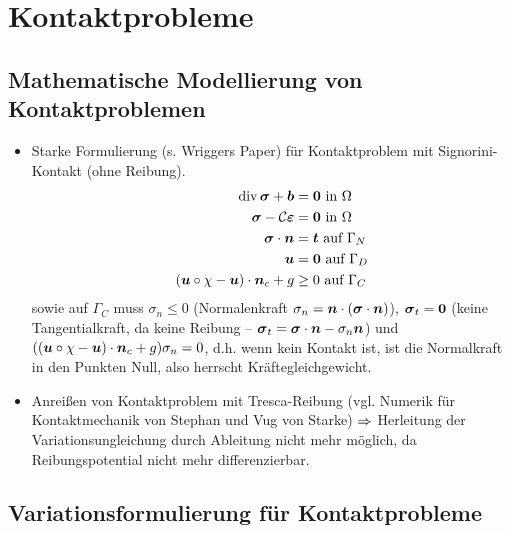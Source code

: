 \section{Kontaktprobleme}

\subsection{Mathematische Modellierung von Kontaktproblemen}

\begin{itemize}
\item Starke Formulierung (s. Wriggers Paper) für Kontaktproblem mit Signorini-Kontakt (ohne Reibung).
\begin{align}
\operatorname{div} \boldsymbol \sigma + \boldsymbol b &= \boldsymbol 0 \text{ in } \Omega\\
\boldsymbol \sigma  - \mathcal C \boldsymbol {\varepsilon} & = \boldsymbol 0 \text{ in } \Omega\\
\boldsymbol \sigma \cdot \boldsymbol n &= \boldsymbol t  \text{ auf } \Gamma_N \\
\boldsymbol u &= \boldsymbol 0 \text{ auf } \Gamma_D \\
(\boldsymbol u \circ \chi - \boldsymbol u) \cdot \boldsymbol n_c + g& \ge 0 \text{ auf } \Gamma_C
\end{align}
sowie auf $\Gamma_C$ muss $\sigma_n \le 0$ (Normalenkraft $\sigma_n = \boldsymbol n\cdot ( \boldsymbol \sigma \cdot \boldsymbol n)$), $\boldsymbol \sigma_t = \boldsymbol 0$ (keine Tangentialkraft, da keine Reibung – $\boldsymbol \sigma_t = \boldsymbol \sigma \cdot \boldsymbol n - \sigma_n \boldsymbol n$) und $((\boldsymbol u \circ \chi - \boldsymbol u) \cdot \boldsymbol n_c + g)\sigma_n = 0$, d.h. wenn kein Kontakt ist, ist die Normalkraft in den Punkten Null, also herrscht Kräftegleichgewicht.
\item Anreißen von Kontaktproblem mit Tresca-Reibung (vgl. Numerik für Kontaktmechanik von Stephan und Vug von Starke) $\Rightarrow$ Herleitung der Variationsungleichung durch Ableitung nicht mehr möglich, da Reibungspotential nicht mehr differenzierbar.
\end{itemize}

\subsection{Variationsformulierung für Kontaktprobleme}

